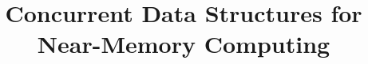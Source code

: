 \documentclass{sig-alternate-05-2015}
\title{Concurrent Data Structures for Near-Memory Computing}
\author{}
\date{}							%
\begin{document}
\maketitle



\newpage
\ 
\newpage
















\begin{comment}
\appendix

\section{Parallelism of memory accesses}
If the distribution of requests to the PIM-managed skip-list is very sharp, that is,
a lot of requests hit a small range of keys, we may have to rebalance the skip-list too often,
incurring significant performance overhead.
However, if we don't rebalance the skip-list frequently,
a large number of requests may be sent one PIM core, which becomes the performance bottleneck.
On the other hand, even existing concurrent skip-list algorithms in which threads execute
their operations by themselves in parallel cannot have good performance either,
since concurrent updates (i.e., add() and delete()) within a small range conflict with one another.
Thus, we believe a PIM-managed skip-list can achieve competitive throughput if each PIM core can
execute multiple read-only requests (i.e., contains()) and at most one update request efficiently.
We have assumed each PIM core can only deal with one request at a time,
but in fact it has the potential to execute multiple requests in parallel.

Hsieh et al. \cite{hsieh2016accelerating} proposed how to design a PIM core that
can make multiple memory accesses for multiple pointer-chasing based requests in parallel.
The idea is that, after requiring a memory access for an operation request A,
it can immediately retrieve another request B without waiting for the data of the memory access for A.
The PIM core will later resume A once the data of the memory access is returned.
In other words, the PIM core can hide its memory access latency by making multiple accesses
in multiple requests in parallel.
In theory, if the sum of the latency of doing the computation between two memory accesses
for a pointer-chasing based request and the latency of switching from one request to another
is only $1/k$ of the latency of a memory access by the PIM core,
the PIM core can essentially execute $k$ requests in parallel without delaying the pointer-chasing
procedure of each request (see \cite{hsieh2016accelerating} for more details).
Those requests can therefore be thought of as requests executed in parallel
by different hardware threads of the PIM core.


\end{comment}
\end{document}
